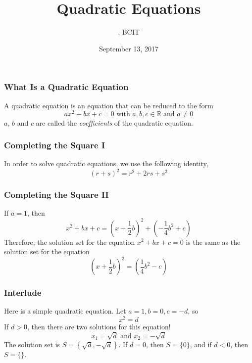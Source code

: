 \documentclass[xcolor=dvipsnames]{beamer}
\title{Quadratic Equations}
\subtitle{{\CourseNumber}, BCIT}
\author{\CourseName}
\date{September 13, 2017}
\begin{document}
\begin{frame}
  \titlepage
\end{frame}

\begin{frame}
  \frametitle{What Is a Quadratic Equation}
A quadratic equation is an equation that can be reduced to the form
\begin{equation}
  \label{eq:paezohmu}
  ax^{2}+bx+c=0\mbox{ with }a,b,c\in\mathbb{R}\mbox{ and }a\neq{}0
\end{equation}
$a$, $b$ and $c$ are called the \emph{coefficients} of the quadratic
equation.
\end{frame}

\begin{frame}
  \frametitle{Completing the Square I}
In order to solve quadratic equations, we use the following identity,
\begin{equation}
  \label{eq:uibaifoa}
  (r+s)^{2}=r^{2}+2rs+s^{2}
\end{equation}
\end{frame}

\begin{frame}
  \frametitle{Completing the Square II}
If $a=1$, then
\begin{equation}
  \label{eq:aiphohpi}
  x^{2}+bx+c=\left(x+\frac{1}{2}b\right)^{2}+\left(-\frac{1}{4}b^{2}+c\right)
\end{equation}
Therefore, the solution set for the equation $x^{2}+bx+c=0$ is the
same as the solution set for the equation
\begin{equation}
  \label{eq:diesaisi}
  \left(x+\frac{1}{2}b\right)^{2}=\left(\frac{1}{4}b^{2}-c\right)
\end{equation}
\end{frame}

\begin{frame}
  \frametitle{Interlude}
Here is a simple quadratic equation. Let $a=1,b=0,c=-d$, so
\begin{equation}
  \label{eq:nuphoomu}
  x^{2}=d
\end{equation}
If $d>0$, then there are two solutions for this equation!
\begin{equation}
  \label{eq:gephoopo}
  x_{1}=\sqrt{d}\mbox{ and }x_{2}=-\sqrt{d}
\end{equation}
The solution set is $S=\left\{\sqrt{d},-\sqrt{d}\right\}$. If $d=0$,
then $S=\{0\}$, and if $d<0$, then $S=\{\}$.
\end{frame}
\end{document}
